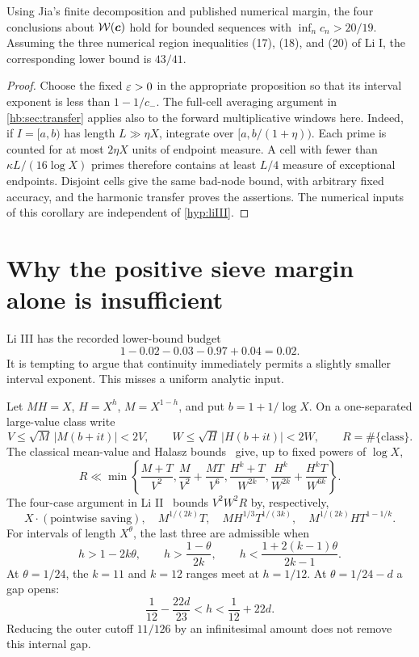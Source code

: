 \begin{corollary}\label{cor:earlier-ranges}
Using Jia's finite decomposition and published numerical margin,
the four conclusions about $\mathcal W(\boldsymbol c)$ hold for bounded
sequences with $\inf_n c_n>20/19$.
Assuming the three numerical region inequalities (17), (18), and
(20) of Li I, the corresponding lower bound is $43/41$.
\end{corollary}
\begin{proof}
Choose the fixed $\varepsilon>0$ in the appropriate proposition so that
its interval exponent is less than $1-1/c_-$.
The full-cell averaging argument in \cref{hb:sec:transfer} applies
also to the forward multiplicative windows here. Indeed, if
$I=[a,b)$ has length $L\gg\eta X$, integrate over
$[a,b/(1+\eta))$. Each prime is counted for at most $2\eta X$
units of endpoint measure. A cell with fewer than
$\kappa L/(16\log X)$ primes therefore contains at least $L/4$
measure of exceptional endpoints. Disjoint cells give the same
bad-node bound, with arbitrary fixed accuracy, and the harmonic
transfer proves the assertions. The numerical inputs of this
corollary are independent of \cref{hyp:liIII}.
\end{proof}

\section{Why the positive sieve margin alone is insufficient}

Li III has the recorded lower-bound budget
\[
             1-0.02-0.03-0.97+0.04=0.02.
\]
It is tempting to argue that continuity immediately permits a slightly
smaller interval exponent. This misses a uniform analytic input.

Let $MH=X$, $H=X^h$, $M=X^{1-h}$, and put $b=1+1/\log X$.
On a one-separated large-value class write
\[
 V\le\sqrt M\,|M(b+it)|<2V,\qquad
 W\le\sqrt H\,|H(b+it)|<2W,\qquad R=\#\{\text{class}\}.
\]
The classical mean-value and Halasz bounds~\cite{Harman} give, up to fixed powers
of $\log X$,
\begin{equation}\label{eq:classic}
 R\ll\min\left\{
 \frac{M+T}{V^2},\frac M{V^2}+\frac{MT}{V^6},
 \frac{H^k+T}{W^{2k}},
 \frac{H^k}{W^{2k}}+\frac{H^kT}{W^{6k}}\right\}.
\end{equation}
The four-case argument in Li II~\cite[Lemma 3.1]{LiII} bounds $V^2W^2R$ by,
respectively,
\[
 X\cdot(\text{pointwise saving}),\quad
 M^{1/(2k)}T,\quad MH^{1/3}T^{1/(3k)},\quad
 M^{1/(2k)}HT^{1-1/k}.
\]
For intervals of length $X^\theta$, the last three are admissible when
\begin{equation}\label{eq:oldcover}
 h>1-2k\theta,\qquad h>\frac{1-\theta}{2k},\qquad
 h<\frac{1+2(k-1)\theta}{2k-1}.
\end{equation}
At $\theta=1/24$, the $k=11$ and $k=12$ ranges meet at $h=1/12$.
At $\theta=1/24-d$ a gap opens:
\[
 \frac1{12}-\frac{22d}{23}<h<\frac1{12}+22d.
\]
Reducing the outer cutoff $11/126$ by an infinitesimal amount does
not remove this internal gap.

